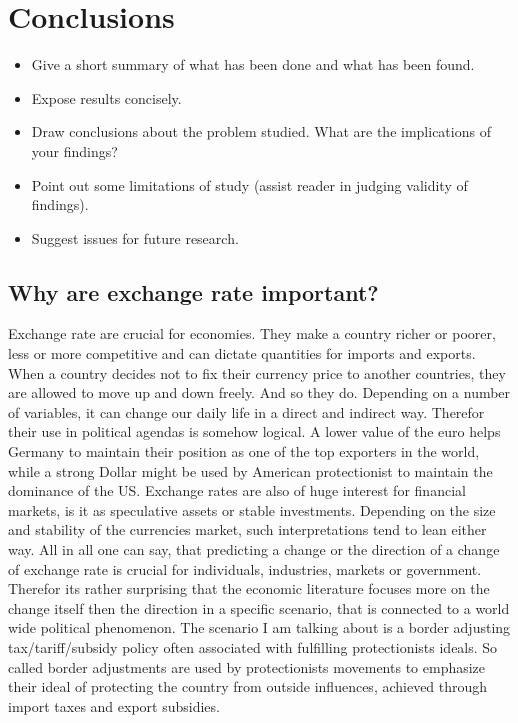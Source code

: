 \section{Conclusions}\label{Sec:Conc}

\begin{itemize}

    \item Give a short summary of what has been done and what has been
    found.

    \item Expose results concisely.

    \item Draw conclusions about the problem studied. What are the
    implications of your findings?

    \item Point out some limitations of study (assist reader in judging validity
    of findings).

    \item Suggest issues for future research.

\end{itemize}



\subsection{Why are exchange rate important?}
Exchange rate are crucial for economies. They make a country richer or poorer, less or more competitive and can dictate quantities for imports and exports. When a country decides not to fix their currency price to another countries, they are allowed to move up and down freely. And so they do. Depending on a number of variables, it can change our daily life in a direct and indirect way. Therefor their use in political agendas is somehow logical. A lower value of the euro helps Germany to maintain their position as one of the top exporters in the world, while a strong Dollar might be used by American protectionist to maintain the dominance of the US. Exchange rates are also of huge interest for financial markets, is it as speculative assets or stable investments. Depending on the size and stability of the currencies market, such interpretations tend to lean either way.
All in all one can say, that predicting a change or the direction of a change of exchange rate is crucial for individuals, industries, markets or government. Therefor its rather surprising that the economic literature focuses more on the change itself then the direction in a specific scenario, that is connected to a world wide political phenomenon. The scenario I am talking about is a border adjusting tax/tariff/subsidy policy often associated with fulfilling protectionists ideals. So called border adjustments are used by protectionists movements to emphasize their ideal of protecting the country from outside influences, achieved through import taxes and export subsidies.

